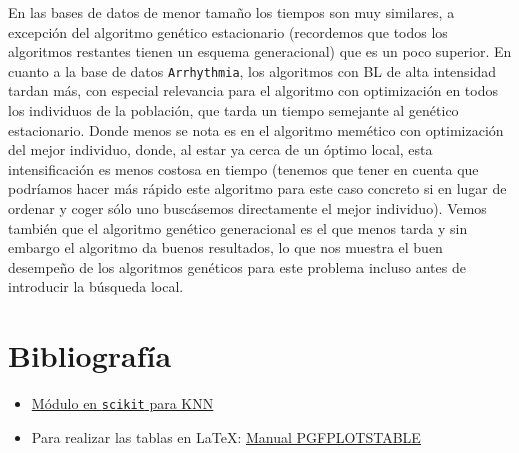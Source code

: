 \documentclass[11pt,leqno]{article}
\begin{document}
	En las bases de datos de menor tamaño los tiempos son muy similares, a excepción del algoritmo genético estacionario (recordemos que todos los algoritmos restantes tienen un esquema generacional) que es un poco superior. En cuanto a la base de datos \texttt{Arrhythmia}, los algoritmos con BL de alta intensidad tardan más, con especial relevancia para el algoritmo con optimización en todos los individuos de la población, que tarda un tiempo semejante al genético estacionario. Donde menos se nota es en el algoritmo memético con optimización del mejor individuo, donde, al estar ya cerca de un óptimo local, esta intensificación es menos costosa en tiempo (tenemos que tener en cuenta que podríamos hacer más rápido este algoritmo para este caso concreto si en lugar de ordenar y coger sólo uno buscásemos directamente el mejor individuo). Vemos también que el algoritmo genético generacional es el que menos tarda y sin embargo el algoritmo da buenos resultados, lo que nos muestra el buen desempeño de los algoritmos genéticos para este problema incluso antes de introducir la búsqueda local.

\section{Bibliografía}
\begin{itemize}
\item \href{http://scikit-learn.org/stable/modules/neighbors.html}{Módulo en \texttt{scikit} para KNN}
\item Para realizar las tablas en \LaTeX: \href{https://www.complang.tuwien.ac.at/doc/texlive-pictures-doc/latex/pgfplots/pgfplotstable.pdf}{Manual PGFPLOTSTABLE}
\end{itemize}
\end{document}
